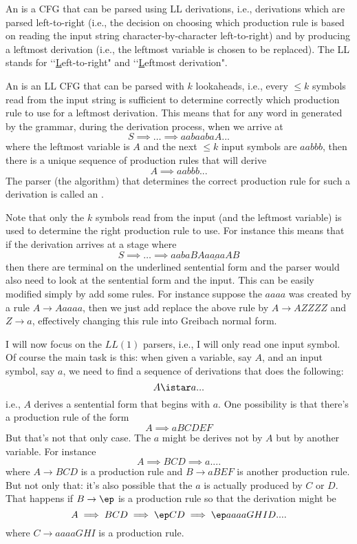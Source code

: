 An  is a CFG that can be parsed
using LL derivations, i.e., derivations which are
parsed left-to-right (i.e., the decision on choosing
which production rule is based on reading the input
string character-by-character left-to-right)
and by producing a leftmost derivation (i.e.,
the leftmost variable is chosen to be replaced).
The LL stands for \lq\lq \underline{L}eft-to-right" and
\lq\lq \underline{L}eftmost derivation".

An 
is an LL CFG that can be parsed with $k$ lookaheads, i.e.,
every $\leq k$ symbols read from the input string is sufficient
to determine correctly which production rule to use for a
leftmost derivation.
This means that for any word in generated by the grammar,
during the derivation process, when we arrive at
\[
S \implies \ldots \implies aabaabaA...
\]
where the leftmost variable is $A$ and the next $\leq k$ input symbols are
$aabbb$, then there is a unique sequence of production rules
that will derive
\[
A \implies aabbb ...
\]  
The parser (the algorithm) that determines the correct production
rule for such a derivation is called an
.

Note that only the $k$ symbols read from the input (and the leftmost
variable) is used to
determine the right production rule to use.
For instance this means that if the derivation arrives at a stage where
\[
S \implies \ldots \implies aaba\underline{BAaaaaAB}
\]
then there are terminal on the underlined sentential form
and the parser would also need to look at the sentential form and the input.
This can be easily modified simply by add some rules.
For instance suppose the $aaaa$ was created by a rule $A \rightarrow Aaaaa$,
then we just add replace the above rule by $A \rightarrow AZZZZ$ and
$Z \rightarrow a$, effectively changing this rule into Greibach normal form.

I will now focus on the $LL(1)$ parsers, i.e., I will only read one
input symbol.
Of course the main task is this: when given a variable, say $A$, and an input
symbol, say $a$, we need to find a sequence of derivations that does the
following:
\[
A \istar  a ...
\]
i.e., $A$ derives a sentential form that begins with $a$.
One possibility is that there's a production rule of the form
\[
A \implies aBCDEF
\]
But that's not that only case.
The $a$ might be derives not by $A$ but by another variable.
For instance
\[
A \implies BCD \implies a ....
\]
where $A \rightarrow BCD$ is a production rule and $B \rightarrow aBEF$
is another production rule.
But not only that: it's also possible that the $a$ is actually produced by
$C$ or $D$.
That happens if $B \rightarrow \ep$ is a production rule so that
the derivation might be
\[
A \implies BCD \implies \ep CD \implies \ep aaaaGHID ....
\]
where $C \rightarrow aaaaGHI$ is a production rule.

